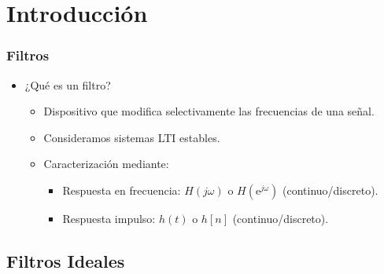 \section{Introducción}

\begin{frame}\frametitle{Filtros}
    \begin{figure}
        \centering
        \small
    \end{figure}
    \begin{itemize}
        \item \alert{¿Qué es un filtro?}\vspace{0.1cm}
        \begin{itemize}\footnotesize
            \item<2-> Dispositivo que modifica selectivamente las frecuencias de una señal.\vspace{0.1cm}
            \item<3-> Consideramos sistemas LTI estables.\vspace{0.1cm}
            \item<4-> Caracterización mediante:
            \begin{itemize}\scriptsize
                \item<4-> Respuesta en frecuencia: \color{blue}$H(j\omega)$ \color{black} o \color{blue}$H(\textrm{e}^{j\omega})$\color{black} (continuo/discreto).\vspace{0.05cm}
                \item<4-> Respuesta impulso: \color{blue}$h(t)$ \color{black} o \color{blue}$h[n]$\color{black} (continuo/discreto).
            \end{itemize}
        \end{itemize}
    \end{itemize}
\end{frame}

\subsection{Filtros Ideales}

